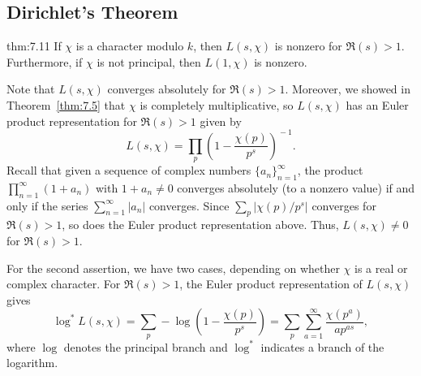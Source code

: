 \subsection{Dirichlet's Theorem}\label{subsec:7.6}

\vspace{2ex}
\begin{theo}{thm:7.11}
    If $\chi$ is a character modulo $k$, then $L(s, \chi)$ is nonzero for 
    $\Re(s) > 1$. Furthermore, if $\chi$ is not principal, then $L(1, \chi)$ 
    is nonzero. 
\end{theo}
\begin{pf}
    Note that $L(s, \chi)$ converges absolutely for $\Re(s) > 1$. Moreover, 
    we showed in Theorem~\ref{thm:7.5} that $\chi$ is completely multiplicative, 
    so $L(s, \chi)$ has an Euler product representation for $\Re(s) > 1$ given by 
    \[ L(s, \chi) = \prod_p \left( 1 - \frac{\chi(p)}{p^s} \right)^{\!-1}. \] 
    Recall that given a sequence of complex numbers $\{a_n\}_{n=1}^\infty$, the 
    product $\prod_{n=1}^\infty (1 + a_n)$ with $1 + a_n \neq 0$ converges 
    absolutely (to a nonzero value) if and only if the series $\sum_{n=1}^\infty 
    |a_n|$ converges. Since $\sum_p |\chi(p)/p^s|$ converges for $\Re(s) > 1$, 
    so does the Euler product representation above. Thus, $L(s, \chi) \neq 0$
    for $\Re(s) > 1$. 

    For the second assertion, we have two cases, depending on whether $\chi$ is a 
    real or complex character. For $\Re(s) > 1$, the Euler product representation
    of $L(s, \chi)$ gives 
    \[ \log^* L(s, \chi) = \sum_p -\log\left(1 - \frac{\chi(p)}{p^s} \right) 
    = \sum_p \sum_{a=1}^\infty \frac{\chi(p^a)}{ap^{as}}, \] 
    where $\log$ denotes the principal branch and $\log^*$ indicates a branch 
    of the logarithm. 


\end{pf}
